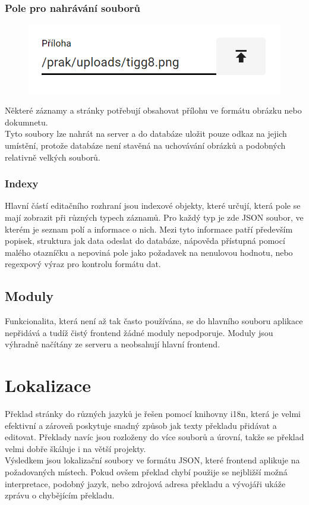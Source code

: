 \subsubsection{Pole pro nahrávání souborů}
\begin{figure}
	\centering
	\includegraphics[width=\linewidth]{img/uploadField.png}
\end{figure}
Některé záznamy a stránky potřebují obsahovat přílohu ve formátu obrázku nebo dokumnetu.\\
Tyto soubory lze nahrát na server a do databáze uložit pouze odkaz na jejich umístění,
protože databáze není stavěná na uchovávání obrázků a podobných relativně velkých souborů.

\subsubsection{Indexy}
Hlavní částí editačního rozhraní jsou indexové objekty, které určují, která pole
se mají zobrazit při různých typech záznamů. Pro každý typ je zde JSON soubor, ve kterém
je seznam polí a informace o nich. Mezi tyto informace patří především popisek, struktura jak
data odeslat do databáze, nápověda přístupná pomocí malého otazníčku a nepoviná pole jako
požadavek na nenulovou hodnotu, nebo regexpový výraz pro kontrolu formátu dat.

\subsection{Moduly}
Funkcionalita, která není až tak často používána, se do hlavního souboru aplikace
nepřidává a tudíž čistý frontend žádné moduly nepodporuje. Moduly jsou výhradně načítány
ze serveru a neobsahují hlavní frontend.

\section{Lokalizace}
Překlad stránky do různých jazyků je řešen pomocí knihovny i18n, která je velmi efektivní a
zároveň poskytuje snadný způsob jak texty překladu přidávat a editovat. 
Překlady navíc jsou rozloženy do více souborů a úrovní, takže se překlad velmi dobře
škáluje i na větší projekty.\\
Výsledkem jsou lokalizační soubory ve formátu JSON, které frontend aplikuje na požadovaných
místech. Pokud ovšem překlad chybí použije se nejbližší možná interpretace, podobný jazyk, nebo
zdrojová adresa překladu a vývojáři ukáže zprávu o chybějícím překladu.
